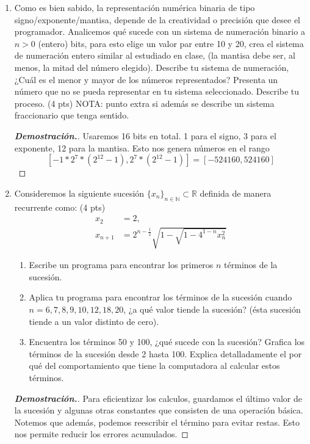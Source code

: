 \documentclass{article}
\newcommand{\N}{\mathbb N}
\newcommand{\R}{\mathbb R}
\begin{document}
	\begin{enumerate}
		
		
		\item Como es bien sabido, la representaci\'on num\'erica binaria de tipo signo/exponente/mantisa, depende de la creatividad o precisi\'on que desee el programador. Analicemos qu\'e sucede con un sistema de numeraci\'on binario a $n>0$ (entero) bits, para esto elige un valor par entre 10 y 20, crea el sistema de numeraci\'on entero similar al estudiado en clase, (la mantisa debe ser, al menos, la mitad del n\'umero elegido). Describe tu sistema de numeraci\'on, ¿Cu\'al es el menor y mayor de los n\'umeros representados? Presenta un n\'umero que no se pueda representar en tu sistema seleccionado. Describe tu proceso. (4 pts) NOTA: punto extra si adem\'as se describe un sistema fraccionario que tenga sentido.
		\begin{mdframed}[
			linecolor=darkgray,
			backgroundcolor=pearl]
			\begin{proof}[\textbf{Demostraci\'on.}]
				Usaremos 16 bits en total. 1 para el signo, 3 para el exponente, 12 para la mantisa. Esto nos genera n\'umeros en el rango
				\[ [-1*2^7*(2^{12} - 1), 2^7*(2^{12} - 1)] = [-524160, 524160] \]
			\end{proof}
		\end{mdframed}
		
		\item Consideremos la siguiente sucesi\'on $\{x_n\}_{n\in \N} \subset \R$ definida de manera recurrente como: (4 pts)
		\begin{align*}
			x_2&=2,\\
			x_{n+1} &= 2^{n-\frac{1}{2}}\sqrt{1-\sqrt{1-4^{1-n}x^2_n}}
		\end{align*}
		\begin{enumerate}
			\item Escribe un programa para encontrar los primeros $n$ t\'erminos de la sucesi\'on.
			\item Aplica tu programa para encontrar los t\'erminos de la sucesi\'on cuando $n = 6, 7, 8, 9, 10, 12, 18, 20$, ¿a qu\'e valor tiende la sucesi\'on? (\'esta sucesi\'on tiende a un valor distinto de cero).
			\item Encuentra los t\'erminos 50 y 100, ¿qu\'e sucede con la sucesi\'on? Grafica los t\'erminos de la sucesi\'on desde 2 hasta 100. Explica detalladamente el por qu\'e del comportamiento que tiene la computadora al calcular estos t\'erminos.
		\end{enumerate}
		\begin{mdframed}[
			linecolor=darkgray,
			backgroundcolor=pearl]
			\begin{proof}[\textbf{Demostraci\'on.}]
				Para eficientizar los calculos, guardamos el \'ultimo valor de la sucesi\'on y algunas otras constantes que consisten de una operaci\'on b\'asica. 
        Notemos que adem\'as, podemos reescribir el t\'ermino para evitar restas. Esto nos permite reducir los errores acumulados.
				
			\end{proof}
		\end{mdframed}
		

\end{enumerate}
\end{document}
